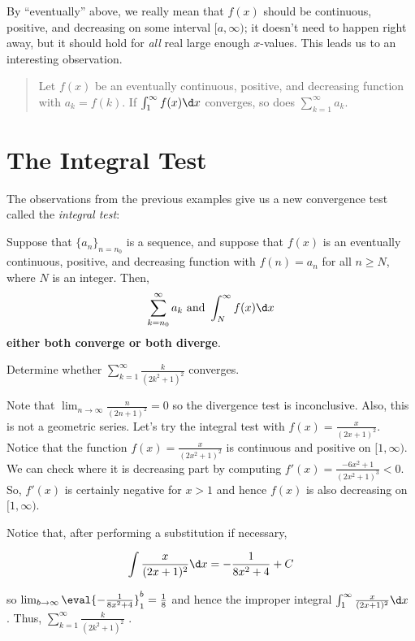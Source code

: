 \documentclass{ximera}
\begin{document}
By ``eventually'' above, we really mean that $f(x)$ should be continuous, positive, and decreasing on some interval $[a,\infty)$; it doesn't need to happen right away, but it should hold for \emph{all} real large enough $x$-values.  This leads us to an interesting observation.
\begin{quote}
  Let $f(x)$ be an eventually continuous, positive, and decreasing function with
    $a_k = f(k)$.  If $\int_1^\infty f(x) \d x$ converges, so does
    $\sum_{k=1}^\infty a_k$.
\end{quote}

\section{The Integral Test}
The observations from the previous examples give us a new convergence test called the \textit{integral test}:
\begin{theorem}
   Suppose that $\{a_n\}_{n=n_0}$ is a sequence, and suppose that $f(x)$ is an eventually continuous, positive, and decreasing function
    with $f(n)=a_n$ for all $n \geq N$, where $N$ is an integer.  Then, 
    \[
    \sum_{k=n_0}^\infty a_k\text{ and }\int_N^\infty f(x) \d x
    \]
    \textbf{either both converge or both diverge}.
    \end{theorem}

\begin{example}
Determine whether $\sum_{k=1}^{\infty} \frac{k}{(2k^2+1)^2}$ converges.

\begin{explanation}
Note that $\lim_{n \to \infty}  \frac{n}{(2n+1)^2} =0$ so the divergence test is inconclusive.  Also, this is not a geometric series.  Let's try the integral test with $f(x) =  \frac{x}{(2x+1)^2}$.  Notice that the function $f(x) = \frac{x}{(2x^2+1)^2}$ is continuous and positive on $[1,\infty)$.  We can check where it is decreasing part by computing $f'(x) = \frac{-6x^2+1}{(2x^2+1)^3} < 0$.  So, $f'(x)$ is certainly negative for $x >1$ and hence $f(x)$ is also decreasing on $[1,\infty)$.

Notice that, after performing a substitution if necessary,  

\[
\int \frac{x}{(2x+1)^2} \d x = -\frac{1}{8x^2+4} +C
\]

so $\lim_{b \to \infty} \eval{ -\frac{1}{8x^2+4}}_1^b = \frac{1}{8}$ and hence the improper integral $\int_1^{\infty}  \frac{x}{(2x+1)^2} \d x $ .  Thus,  $\sum_{k=1}^{\infty} \frac{k}{(2k^2+1)^2}$ .

\end{explanation}

\end{example}
\end{document}

